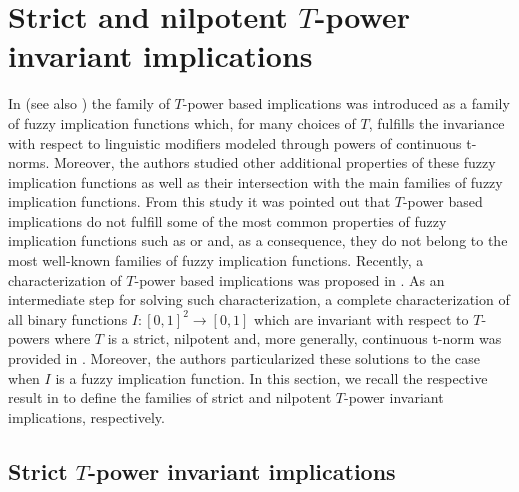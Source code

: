\section{Strict and nilpotent $T$-power invariant implications}\label{section:Tpowerimplications}

In \cite{Massanet2017} (see also \cite{Massanet2019}) the family of $T$-power based implications was introduced as a family of fuzzy implication functions which, for many choices of $T$, fulfills the invariance with respect to linguistic modifiers modeled through powers of continuous t-norms. Moreover, the authors studied other additional properties of these fuzzy implication functions as well as their intersection with the main families of fuzzy implication functions. From this study it was pointed out that $T$-power based implications do not fulfill some of the most common properties of fuzzy implication functions such as \NP or \EP and, as a consequence, they do not belong to the most well-known families of fuzzy implication functions. Recently, a characterization of $T$-power based implications was proposed in \cite{Massanet2019B}. As an intermediate step for solving such characterization, a complete characterization of all binary functions $I:[0,1]^2 \to [0,1]$ which are invariant with respect to $T$-powers where $T$ is a strict, nilpotent and, more generally, continuous t-norm was provided in \cite{Massanet2019B}. Moreover, the authors particularized these solutions to the case when $I$ is a fuzzy implication function. In this section, we recall the respective result in \cite{Massanet2019B} to define the families of strict and nilpotent $T$-power invariant implications, respectively. 

\subsection{Strict $T$-power invariant implications}\label{subsection:strictTpowerimplications}


